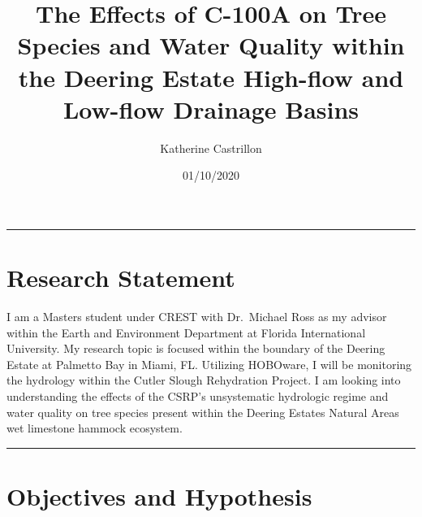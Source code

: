 \documentclass[
]{article}
\title{The Effects of C-100A on Tree Species and Water Quality within the
Deering Estate High-flow and Low-flow Drainage Basins}
\author{Katherine Castrillon}
\date{01/10/2020}
\begin{document}
\maketitle

\begin{center}\rule{0.5\linewidth}{\linethickness}\end{center}

\hypertarget{research-statement}{%
\section{Research Statement}\label{research-statement}}

I am a Masters student under CREST with Dr.~Michael Ross as my advisor
within the Earth and Environment Department at Florida International
University. My research topic is focused within the boundary of the
Deering Estate at Palmetto Bay in Miami, FL. Utilizing HOBOware, I will
be monitoring the hydrology within the Cutler Slough Rehydration
Project. I am looking into understanding the effects of the CSRP's
unsystematic hydrologic regime and water quality on tree species present
within the Deering Estates Natural Areas wet limestone hammock
ecosystem.

\begin{center}\rule{0.5\linewidth}{\linethickness}\end{center}

\hypertarget{objectives-and-hypothesis}{%
\section{Objectives and Hypothesis}\label{objectives-and-hypothesis}}
\end{document}
